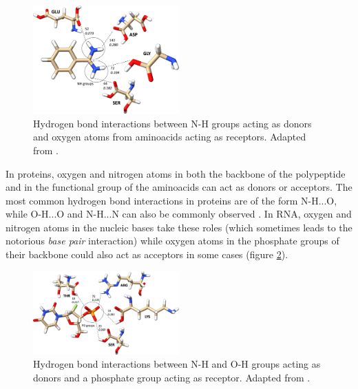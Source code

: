     \begin{figure}[H]
      \centering
      \includegraphics[width=0.5\textwidth]{figures/intro/hbonds.png}
      \caption{\label{fig:intro/hbonds} Hydrogen bond interactions between N-H groups acting as donors and oxygen atoms from aminoacids acting as receptors. Adapted from \cite{hbonds_2023}.}
    \end{figure}

    In proteins, oxygen and nitrogen atoms in both the backbone of the polypeptide and in the functional group of the aminoacids can act as donors or acceptors. The most common hydrogen bond interactions in proteins are of the form N-H...O, while O-H...O and N-H...N can also be commonly observed \cite{hbonds_2023}. In RNA, oxygen and nitrogen atoms in the nucleic bases take these roles (which sometimes leads to the notorious \textit{base pair} interaction) \cite{rna_2015} while oxygen atoms in the phosphate groups of their backbone could also act as acceptors in some cases \cite{hbonds_2023} (figure \ref{fig:intro/hbonds_po}).

    \begin{figure}[H]
      \centering
      \includegraphics[width=0.5\textwidth]{figures/intro/hbonds_po.png}
      \caption{\label{fig:intro/hbonds_po} Hydrogen bond interactions between N-H and O-H groups acting as donors and a phosphate group acting as receptor. Adapted from \cite{hbonds_2023}.}
    \end{figure}

